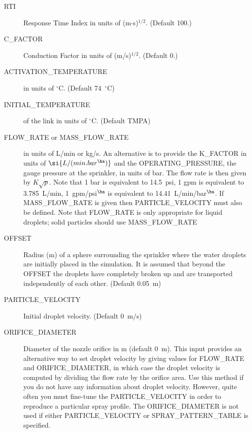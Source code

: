 \documentclass[11pt]{book}
\begin{document}
\begin{description}
\item[{\ct RTI}] Response Time Index in units of (m$\cdot$s)$^{1/2}$. (Default 100.)
\item[{\ct C\_FACTOR}] Conduction Factor in units of (m/s)$^{1/2}$. (Default 0.)
\item[{\ct ACTIVATION\_TEMPERATURE}] in units of $^\circ$C. (Default 74~$^\circ$C)
\item[{\ct INITIAL\_TEMPERATURE}] of the link in units of $^\circ$C. (Default {\ct TMPA})
\item[{\ct FLOW\_RATE} or {\ct MASS\_FLOW\_RATE}] in units of L/min or kg/s. An alternative is to provide the {\ct K\_FACTOR} in units of $\si{L/(min.bar^{\ha})}$ and the {\ct OPERATING\_PRESSURE}, the gauge pressure at the sprinkler, in units of bar. The flow rate is then given by $K \sqrt{p}$. Note that 1 bar is equivalent to 14.5~psi, 1 gpm is equivalent to 3.785~L/min, 1~gpm/psi$^\ha$ is equivalent to 14.41~L/min/bar$^\ha$.  If {\ct MASS\_FLOW\_RATE} is given then {\ct PARTICLE\_VELOCITY} must also be defined. Note that {\ct FLOW\_RATE} is only appropriate for liquid droplets; solid particles should use {\ct MASS\_FLOW\_RATE}
\item[{\ct OFFSET}] Radius (m) of a sphere surrounding the sprinkler where the water droplets are initially placed in the simulation. It is assumed that beyond the {\ct OFFSET} the droplets have completely broken up and are transported independently of each other. (Default 0.05~m)
\item[{\ct PARTICLE\_VELOCITY}]  Initial droplet velocity. (Default 0~m/s)
\item[{\ct ORIFICE\_DIAMETER}] Diameter of the nozzle orifice in m (default 0~m). This input provides an alternative way to set droplet velocity by giving values for {\ct FLOW\_RATE} and {\ct ORIFICE\_DIAMETER}, in which case the droplet velocity is computed by dividing the flow rate by the orifice area. Use this method if you do not have any information about droplet velocity. However, quite often you must fine-tune the {\ct PARTICLE\_VELOCITY} in order to reproduce a particular spray profile. The {\ct ORIFICE\_DIAMETER} is not used if either {\ct PARTICLE\_VELOCITY} or {\ct SPRAY\_PATTERN\_TABLE} is specified.

\end{description}
\end{document}
